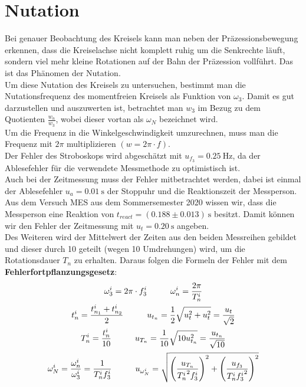 

\section{Nutation}

Bei genauer Beobachtung des Kreisels kann man neben der Präzessionsbewegung erkennen, dass die Kreiselachse nicht komplett ruhig um die Senkrechte läuft, sondern viel mehr kleine Rotationen auf der Bahn der Präzession vollführt. Das ist das Phänomen der Nutation.\\
Um diese Nutation des Kreisels zu untersuchen, bestimmt man die Nutationsfrequenz des momentfreien Kreisels als Funktion von $\omega_3$. Damit es gut darzustellen und auszuwerten ist, betrachtet man $w_3$ im Bezug zu dem Quotienten $\frac{w_n}{w_3}$, wobei dieser vortan als $\omega_N$ bezeichnet wird. \\
Um die Frequenz in die Winkelgeschwindigkeit umzurechnen, muss man die Frequenz mit $2\pi$ multiplizieren $(w =2\pi\cdot f)$.\\
Der Fehler des Stroboskops wird abgeschätzt mit $u_{f_3}=0.25~\text{Hz}$, da der Ablesefehler für die verwendete Messmethode zu optimistisch ist. \\
Auch bei der Zeitmessung muss der Fehler mitbetrachtet werden, dabei ist einmal der Ablesefehler $u_a=0.01~\text{s}$ der Stoppuhr und die Reaktionszeit der Messperson. Aus dem Versuch MES aus dem Sommersemester 2020 wissen wir, dass die Messperson eine Reaktion von $t_{react}=(0.188\pm0.013)~\text{s}$ besitzt. Damit können wir den Fehler der Zeitmessung mit $u_t=0.20~\text{s}$ angeben. \\
Des Weiteren wird der Mittelwert der Zeiten aus den beiden Messreihen gebildet und dieser durch 10 geteilt (wegen 10 Umdrehungen) wird, um die Rotationsdauer $T_n$ zu erhalten. Daraus folgen die Formeln der Fehler mit dem \textbf{Fehlerfortpflanzungsgesetz}:
\begin{gather}
    \omega_3^i=2\pi\cdot f_3^i  \tab \omega_n^i = \frac{2\pi}{T_n^i}\\
    t_n^i = \frac{t_{n_1}^i+t_{n_2}^i}{2}\tab u_{t_n} = \frac{1}{2}\sqrt{u_t^2+u_t^2}=\frac{u_t}{\sqrt{2}}\\
    T_n^i=\frac{t_n^i}{10} \tab u_{T_n} = \frac{1}{10}\sqrt{10u_{t_n}^2} = \frac{u_{t_n}}{\sqrt{10}}\\[0.3mm]
    \omega_N^i=\frac{\omega_n^i}{\omega_3^i} = \frac{1}{T_n^i f_3^i} 
    \tab u_{\omega_N^i} = \sqrt{\left(\frac{u_{T_n}}{{T_n^i}^2f_3^i}\right)^2+\left(\frac{u_{f_3}}{T_n^i{f_3^i}^2}\right)^2} 
\end{gather}
